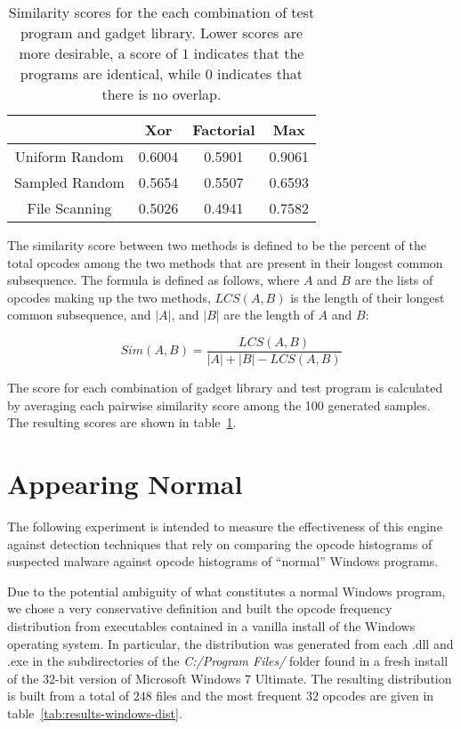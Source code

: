 \documentclass[finalcopy,short]{srpaper}
\begin{document}
        \begin{table}
            \centering
            \begin{tabular}{|c||c|c|c|}
                \hline
                                & Xor & Factorial & Max \\
                \hline
                Uniform Random  & 0.6004 & 0.5901 & 0.9061 \\
                \hline
                Sampled Random  & 0.5654 & 0.5507 & 0.6593 \\
                \hline
                File Scanning   & 0.5026 & 0.4941 & 0.7582 \\
                \hline
            \end{tabular}
            \caption{Similarity scores for the each combination of test program
            and gadget library. Lower scores are more desirable, a score of $1$
            indicates that the programs are identical, while $0$ indicates that
            there is no overlap.}
            \label{tab:results-different}
        \end{table}

        The similarity score between two methods is defined to be the percent of
        the total opcodes among the two methods that are present in their longest
        common subsequence. The formula is defined as follows, where
        $A$ and $B$ are the lists of opcodes making up the two methods,
        $LCS(A,B)$ is the length of their longest common subsequence, and $|A|$,
        and $|B|$ are the length of $A$ and $B$:

        $$Sim(A,B) = \frac{LCS(A,B)}{|A| + |B| - LCS(A,B)}$$

        The score for each combination of gadget library and test program is
        calculated by averaging each pairwise similarity score among the 100
        generated samples.  The resulting scores are shown in
        table~\ref{tab:results-different}. 

    \section{Appearing Normal}

        The following experiment is intended to measure the effectiveness of
        this engine against detection techniques that rely on comparing the
        opcode histograms of suspected malware against opcode histograms of
        ``normal'' Windows programs.

        Due to the potential ambiguity of what constitutes a normal Windows
        program, we chose a very conservative definition and built the opcode
        frequency distribution from executables contained in a vanilla install
        of the Windows operating system. In particular, the distribution was
        generated from each {.dll} and {.exe} in the subdirectories of the
        \emph{C:/Program Files/} folder found in a fresh install of the 32-bit
        version of Microsoft Windows 7 Ultimate. The resulting distribution is
        built from a total of $248$ files and the most frequent $32$ opcodes are
        given in table~\ref{tab:results-windows-dist}.
\end{document}
